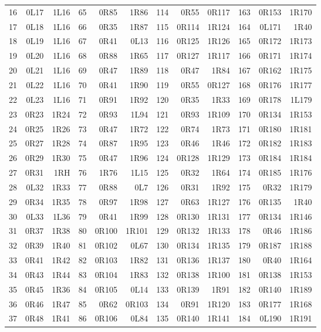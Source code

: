 \begin{center}
\begin{tabular}{rrr@{\hspace{7mm}}rrr@{\hspace{7mm}}rrr@{\hspace{7mm}}rrr}
16 & 0L17 & 1L16 & 65 & 0R85 & 1R86 & 114 & 0R55 & 0R117 & 163 & 0R153 & 1R170 \\
17 & 0L18 & 1L16 & 66 & 0R35 & 1R87 & 115 & 0R114 & 1R124 & 164 & 0L171 & 1R40 \\
18 & 0L19 & 1L16 & 67 & 0R41 & 0L13 & 116 & 0R125 & 1R126 & 165 & 0R172 & 1R173 \\
19 & 0L20 & 1L16 & 68 & 0R88 & 1R65 & 117 & 0R127 & 1R117 & 166 & 0R171 & 1R174 \\
20 & 0L21 & 1L16 & 69 & 0R47 & 1R89 & 118 & 0R47 & 1R84 & 167 & 0R162 & 1R175 \\
21 & 0L22 & 1L16 & 70 & 0R41 & 1R90 & 119 & 0R55 & 0R127 & 168 & 0R176 & 1R177 \\
22 & 0L23 & 1L16 & 71 & 0R91 & 1R92 & 120 & 0R35 & 1R33 & 169 & 0R178 & 1L179 \\
23 & 0R23 & 1R24 & 72 & 0R93 & 1L94 & 121 & 0R93 & 1R109 & 170 & 0R134 & 1R153 \\
24 & 0R25 & 1R26 & 73 & 0R47 & 1R72 & 122 & 0R74 & 1R73 & 171 & 0R180 & 1R181 \\
25 & 0R27 & 1R28 & 74 & 0R87 & 1R95 & 123 & 0R46 & 1R46 & 172 & 0R182 & 1R183 \\
26 & 0R29 & 1R30 & 75 & 0R47 & 1R96 & 124 & 0R128 & 1R129 & 173 & 0R184 & 1R184 \\
27 & 0R31 & 1RH & 76 & 1R76 & 1L15 & 125 & 0R32 & 1R64 & 174 & 0R185 & 1R176 \\
28 & 0L32 & 1R33 & 77 & 0R88 & 0L7 & 126 & 0R31 & 1R92 & 175 & 0R32 & 1R179 \\
29 & 0R34 & 1R35 & 78 & 0R97 & 1R98 & 127 & 0R63 & 1R127 & 176 & 0R135 & 1R40 \\
30 & 0L33 & 1L36 & 79 & 0R41 & 1R99 & 128 & 0R130 & 1R131 & 177 & 0R134 & 1R146 \\
31 & 0R37 & 1R38 & 80 & 0R100 & 1R101 & 129 & 0R132 & 1R133 & 178 & 0R46 & 1R186 \\
32 & 0R39 & 1R40 & 81 & 0R102 & 0L67 & 130 & 0R134 & 1R135 & 179 & 0R187 & 1R188 \\
33 & 0R41 & 1R42 & 82 & 0R103 & 1R82 & 131 & 0R136 & 1R137 & 180 & 0R40 & 1R164 \\
34 & 0R43 & 1R44 & 83 & 0R104 & 1R83 & 132 & 0R138 & 1R100 & 181 & 0R138 & 1R153 \\
35 & 0R45 & 1R36 & 84 & 0R105 & 0L14 & 133 & 0R139 & 1R91 & 182 & 0R140 & 1R189 \\
36 & 0R46 & 1R47 & 85 & 0R62 & 0R103 & 134 & 0R91 & 1R120 & 183 & 0R177 & 1R168 \\
37 & 0R48 & 1R41 & 86 & 0R106 & 0L84 & 135 & 0R140 & 1R141 & 184 & 0L190 & 1R191 \\

\end{tabular}
\end{center}
